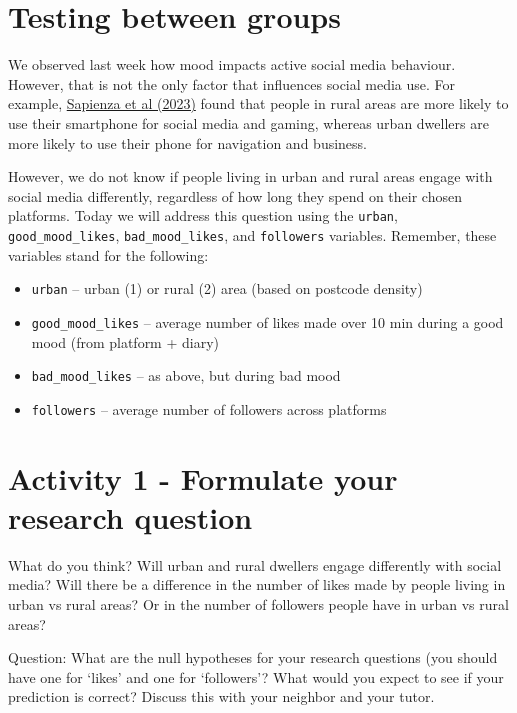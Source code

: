 \documentclass[
]{book}
\providecommand{\tightlist}{%
  \setlength{\itemsep}{0pt}\setlength{\parskip}{0pt}}
\begin{document}
\section{Testing between groups}\label{testing-between-groups-1}

We observed last week how mood impacts active social media behaviour. However, that is not the only factor that influences social media use. For example, \href{https://academic.oup.com/pnasnexus/article/2/11/pgad357/7442564}{Sapienza et al (2023)} found that people in rural areas are more likely to use their smartphone for social media and gaming, whereas urban dwellers are more likely to use their phone for navigation and business.

However, we do not know if people living in urban and rural areas engage with social media differently, regardless of how long they spend on their chosen platforms. Today we will address this question using the \texttt{urban}, \texttt{good\_mood\_likes}, \texttt{bad\_mood\_likes}, and \texttt{followers} variables. Remember, these variables stand for the following:

\begin{itemize}
\tightlist
\item
  \texttt{urban} -- urban (1) or rural (2) area (based on postcode density)
\item
  \texttt{good\_mood\_likes} -- average number of likes made over 10 min during a good mood (from platform + diary)
\item
  \texttt{bad\_mood\_likes} -- as above, but during bad mood
\item
  \texttt{followers} -- average number of followers across platforms
\end{itemize}

\section{Activity 1 - Formulate your research question}\label{activity-1---formulate-your-research-question}

What do you think? Will urban and rural dwellers engage differently with social media? Will there be a difference in the number of likes made by people living in urban vs rural areas? Or in the number of followers people have in urban vs rural areas?

Question: What are the null hypotheses for your research questions (you should have one for `likes' and one for `followers'? What would you expect to see if your prediction is correct? Discuss this with your neighbor and your tutor.
\end{document}
